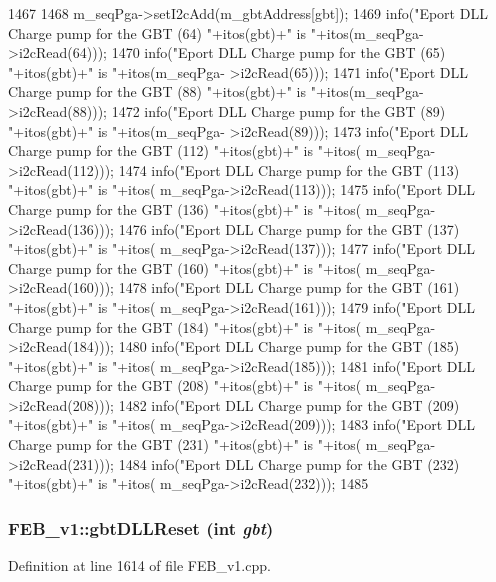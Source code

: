 \begin{DoxyCode}
1467                                  {
1468   m_seqPga->setI2cAdd(m_gbtAddress[gbt]);
1469   info("Eport DLL Charge pump for the GBT (64)  "+itos(gbt)+" is "+itos(m_seqPga-
      >i2cRead(64)));
1470   info("Eport DLL Charge pump for the GBT (65)  "+itos(gbt)+" is "+itos(m_seqPga-
      >i2cRead(65)));
1471   info("Eport DLL Charge pump for the GBT (88)  "+itos(gbt)+" is "+itos(m_seqPga-
      >i2cRead(88)));
1472   info("Eport DLL Charge pump for the GBT (89)  "+itos(gbt)+" is "+itos(m_seqPga-
      >i2cRead(89)));
1473   info("Eport DLL Charge pump for the GBT (112)  "+itos(gbt)+" is "+itos(
      m_seqPga->i2cRead(112)));
1474   info("Eport DLL Charge pump for the GBT (113)  "+itos(gbt)+" is "+itos(
      m_seqPga->i2cRead(113)));
1475   info("Eport DLL Charge pump for the GBT (136)  "+itos(gbt)+" is "+itos(
      m_seqPga->i2cRead(136)));
1476   info("Eport DLL Charge pump for the GBT (137)  "+itos(gbt)+" is "+itos(
      m_seqPga->i2cRead(137)));
1477   info("Eport DLL Charge pump for the GBT (160)  "+itos(gbt)+" is "+itos(
      m_seqPga->i2cRead(160)));
1478   info("Eport DLL Charge pump for the GBT (161)  "+itos(gbt)+" is "+itos(
      m_seqPga->i2cRead(161)));
1479   info("Eport DLL Charge pump for the GBT (184)  "+itos(gbt)+" is "+itos(
      m_seqPga->i2cRead(184)));
1480   info("Eport DLL Charge pump for the GBT (185)  "+itos(gbt)+" is "+itos(
      m_seqPga->i2cRead(185)));
1481   info("Eport DLL Charge pump for the GBT (208)  "+itos(gbt)+" is "+itos(
      m_seqPga->i2cRead(208)));
1482   info("Eport DLL Charge pump for the GBT (209)  "+itos(gbt)+" is "+itos(
      m_seqPga->i2cRead(209)));
1483   info("Eport DLL Charge pump for the GBT (231)  "+itos(gbt)+" is "+itos(
      m_seqPga->i2cRead(231)));
1484   info("Eport DLL Charge pump for the GBT (232)  "+itos(gbt)+" is "+itos(
      m_seqPga->i2cRead(232)));  
1485 }
\end{DoxyCode}
\hypertarget{classFEB__v1_a79b299ce9b36b51916103371aef027df}{
\subsubsection[{gbtDLLReset}]{ FEB\_\-v1::gbtDLLReset (int {\em gbt})}}
\label{classFEB__v1_a79b299ce9b36b51916103371aef027df}


Definition at line 1614 of file FEB\_\-v1.cpp.

